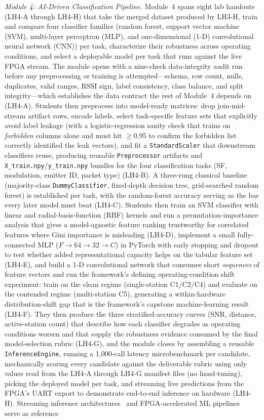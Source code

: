 \documentclass[conference]{IEEEtran}
\begin{document}
\textit{Module 4: AI-Driven Classification Pipeline.} Module~4 spans eight lab handouts (LH4-A through LH4-H) that take the merged dataset produced by LH3-H, train and compare four classifier families (random forest, support vector machine (SVM), multi-layer perceptron (MLP), and one-dimensional (1-D) convolutional neural network (CNN)) per task, characterize their robustness across operating conditions, and select a deployable model per task that runs against the live FPGA stream. The module opens with a nine-check data-integrity audit run before any preprocessing or training is attempted---schema, row count, nulls, duplicates, valid ranges, RSSI sign, label consistency, class balance, and split integrity---which establishes the data contract the rest of Module~4 depends on (LH4-A). Students then preprocess into model-ready matrices: drop join-mid-stream artifact rows, encode labels, select task-specific feature sets that explicitly avoid label leakage (with a logistic-regression sanity check that trains on \emph{forbidden} columns alone and must hit $\geq$0.95 to confirm the forbidden list correctly identified the leak vectors), and fit a \texttt{StandardScaler} that downstream classifiers reuse, producing reusable \texttt{Preprocessor} artifacts and \texttt{X\_train.npy}/\texttt{y\_train.npy} bundles for the four classification tasks (SF, modulation, emitter ID, packet type) (LH4-B). A three-rung classical baseline (majority-class \texttt{DummyClassifier}, fixed-depth decision tree, grid-searched random forest) is established per task, with the random-forest accuracy serving as the bar every later model must beat (LH4-C). Students then train an SVM classifier with linear and radial-basis-function (RBF) kernels and run a permutation-importance analysis that gives a model-agnostic feature ranking trustworthy for correlated features where Gini importance is misleading (LH4-D), implement a small fully-connected MLP ($F\rightarrow64\rightarrow32\rightarrow C$) in PyTorch with early stopping and dropout to test whether added representational capacity helps on the tabular feature set (LH4-E), and build a 1-D convolutional network that consumes short \emph{sequences} of feature vectors and run the framework's defining operating-condition shift experiment: train on the clean regime (single-station C1/C2/C4) and evaluate on the contended regime (multi-station C5), generating a within-hardware distribution-shift gap that is the framework's capstone machine-learning result~\cite{b6} (LH4-F). They then produce the three stratified-accuracy curves (SNR, distance, active-station count) that describe how each classifier degrades as operating conditions worsen and that supply the robustness evidence consumed by the final model-selection rubric (LH4-G), and the module closes by assembling a reusable \texttt{InferenceEngine}, running a 1{,}000-call latency microbenchmark per candidate, mechanically scoring every candidate against the deliverable rubric using only values read from the LH4-A through LH4-G manifest files (no hand-tuning), picking the deployed model per task, and streaming live predictions from the FPGA's UART export to demonstrate end-to-end inference on hardware (LH4-H). Streaming inference architectures~\cite{b3} and FPGA-accelerated ML pipelines~\cite{b2} serve as reference 
\end{document}
